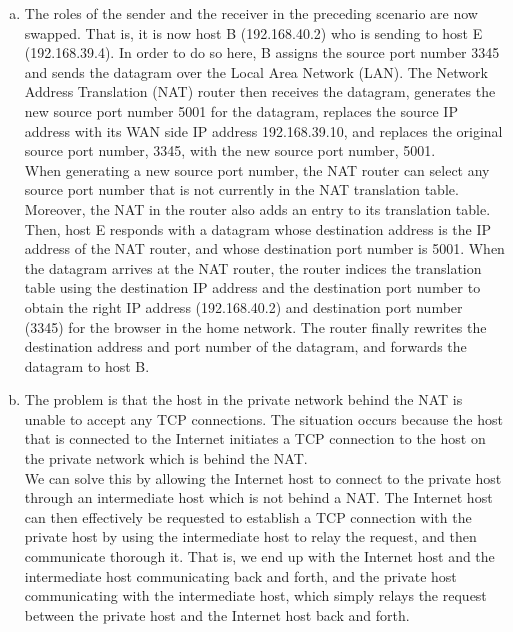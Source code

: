 \documentclass[10pt]{article}
\begin{document}
\begin{enumerate}[a)]
    \item The roles of the sender and the receiver in the preceding scenario are now swapped. That is, it is now host B (192.168.40.2) who is sending to host E (192.168.39.4). In order to do so here, B assigns the source port number 3345 and sends the datagram over the Local Area Network (LAN). The Network Address Translation (NAT) router then receives the datagram, generates the new source port number 5001 for the datagram, replaces the source IP address with its WAN side IP address 192.168.39.10, and replaces the original source port number, 3345, with the new source port number, 5001. \\

When generating a new source port number, the NAT router can select any source port number that is not currently in the NAT translation table. Moreover, the NAT in the router also adds an entry to its translation table. \\

Then, host E responds with a datagram whose destination address is the IP address of the NAT router, and whose destination port number is 5001. When the datagram arrives at the NAT router, the router indices the translation table using the destination IP address and the destination port number to obtain the right IP address (192.168.40.2) and destination port number (3345) for the browser in the home network. The router finally rewrites the destination address and port number of the datagram, and forwards the datagram to host B.
    \item The problem is that the host in the private network behind the NAT is unable to accept any TCP connections. The situation occurs because the host that is connected to the Internet initiates a TCP connection to the host on the private network which is behind the NAT. \\

We can solve this by allowing the Internet host to connect to the private host through an intermediate host which is not behind a NAT. The Internet host can then effectively be requested to establish a TCP connection with the private host by using the intermediate host to relay the request, and then communicate thorough it. That is, we end up with the Internet host and the intermediate host communicating back and forth, and the private host communicating with the intermediate host, which simply relays the request between the private host and the Internet host back and forth.
\end{enumerate}
\end{document}
